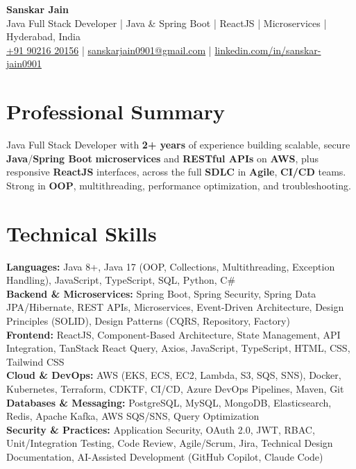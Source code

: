 \documentclass[a4paper,10pt]{article}
\begin{document}
\begin{center}
    {\LARGE \textbf{Sanskar Jain}} \\
    \vspace{2pt}
    Java Full Stack Developer \;|\; Java \& Spring Boot \;|\; ReactJS \;|\; Microservices \;|\; Hyderabad, India \\
    \vspace{2pt}
    \href{tel:+919021620156}{+91 90216 20156} \;|\;
    \href{mailto:sanskarjain0901@gmail.com}{sanskarjain0901@gmail.com} \;|\;
    \href{https://www.linkedin.com/in/sanskar-jain0901/}{linkedin.com/in/sanskar-jain0901}
\end{center}

\section*{Professional Summary}
Java Full Stack Developer with \textbf{2+ years} of experience building scalable, secure \textbf{Java}/\textbf{Spring Boot} \textbf{microservices} and \textbf{RESTful APIs} on \textbf{AWS}, plus responsive \textbf{ReactJS} interfaces, across the full \textbf{SDLC} in \textbf{Agile}, \textbf{CI/CD} teams.
Strong in \textbf{OOP}, multithreading, performance optimization, and troubleshooting.

\section*{Technical Skills}
\begin{sloppypar}
\noindent
\textbf{Languages:} Java 8+, Java 17 (OOP, Collections, Multithreading, Exception Handling), JavaScript, TypeScript, SQL, Python, C\# \\
\textbf{Backend \& Microservices:} Spring Boot, Spring Security, Spring Data JPA/Hibernate, REST APIs, Microservices, Event-Driven Architecture, Design Principles (SOLID), Design Patterns (CQRS, Repository, Factory) \\
\textbf{Frontend:} ReactJS, Component-Based Architecture, State Management, API Integration, TanStack React Query, Axios, JavaScript, TypeScript, HTML, CSS, Tailwind CSS \\
\textbf{Cloud \& DevOps:} AWS (EKS, ECS, EC2, Lambda, S3, SQS, SNS), Docker, Kubernetes, Terraform, CDKTF, CI/CD, Azure DevOps Pipelines, Maven, Git \\
\textbf{Databases \& Messaging:} PostgreSQL, MySQL, MongoDB, Elasticsearch, Redis, Apache Kafka, AWS SQS/SNS, Query Optimization \\
\textbf{Security \& Practices:} Application Security, OAuth 2.0, JWT, RBAC, Unit/Integration Testing, Code Review, Agile/Scrum, Jira, Technical Design Documentation, AI-Assisted Development (GitHub Copilot, Claude Code)
\end{sloppypar}
\end{document}
